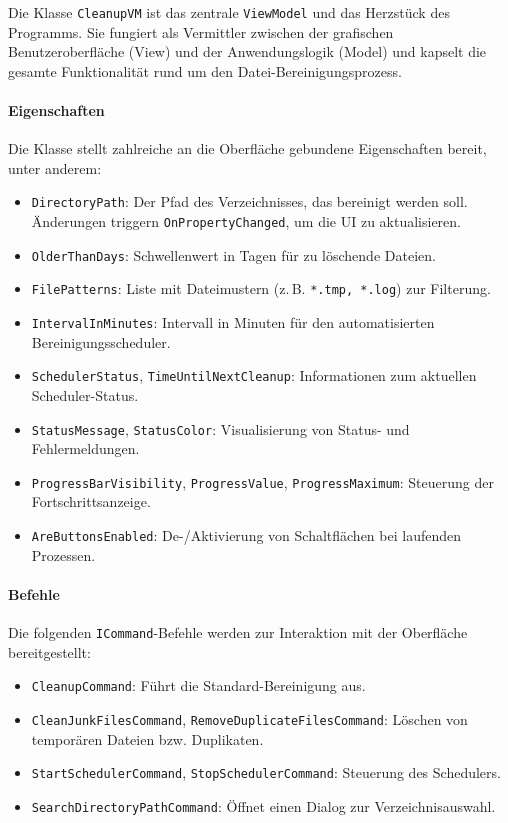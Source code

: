

Die Klasse \texttt{CleanupVM} ist das zentrale \texttt{ViewModel} und das Herzstück des Programms. Sie fungiert als Vermittler zwischen der grafischen Benutzeroberfläche (View) und der Anwendungslogik (Model) und kapselt die gesamte Funktionalität rund um den Datei-Bereinigungsprozess. 

\paragraph{Eigenschaften}
Die Klasse stellt zahlreiche an die Oberfläche gebundene Eigenschaften bereit, unter anderem:

\begin{itemize}
  \item \texttt{DirectoryPath}: Der Pfad des Verzeichnisses, das bereinigt werden soll. Änderungen triggern \texttt{OnPropertyChanged}, um die UI zu aktualisieren.
  \item \texttt{OlderThanDays}: Schwellenwert in Tagen für zu löschende Dateien.
  \item \texttt{FilePatterns}: Liste mit Dateimustern (z.\,B. \texttt{*.tmp, *.log}) zur Filterung.
  \item \texttt{IntervalInMinutes}: Intervall in Minuten für den automatisierten Bereinigungsscheduler.
  \item \texttt{SchedulerStatus}, \texttt{TimeUntilNextCleanup}: Informationen zum aktuellen Scheduler-Status.
  \item \texttt{StatusMessage}, \texttt{StatusColor}: Visualisierung von Status- und Fehlermeldungen.
  \item \texttt{ProgressBarVisibility}, \texttt{ProgressValue}, \texttt{ProgressMaximum}: Steuerung der Fortschrittsanzeige.
  \item \texttt{AreButtonsEnabled}: De-/Aktivierung von Schaltflächen bei laufenden Prozessen.
\end{itemize}

\paragraph{Befehle}
Die folgenden \texttt{ICommand}-Befehle werden zur Interaktion mit der Oberfläche bereitgestellt:

\begin{itemize}
  \item \texttt{CleanupCommand}: Führt die Standard-Bereinigung aus.
  \item \texttt{CleanJunkFilesCommand}, \texttt{RemoveDuplicateFilesCommand}: Löschen von temporären Dateien bzw. Duplikaten.
  \item \texttt{StartSchedulerCommand}, \texttt{StopSchedulerCommand}: Steuerung des Schedulers.
  \item \texttt{SearchDirectoryPathCommand}: Öffnet einen Dialog zur Verzeichnisauswahl.
\end{itemize}

